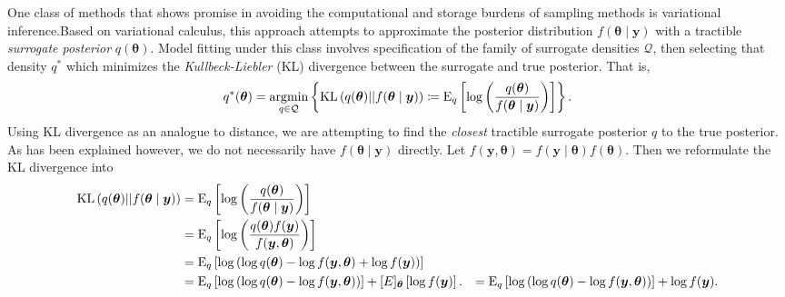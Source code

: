 One class of methods that shows promise in avoiding the computational and storage
    burdens of sampling methods is variational inference.\needcite  Based on variational
    calculus, this approach attempts to approximate the posterior distribution
    $f(\bm{\theta}\mid\bm{y})$ with a tractible \emph{surrogate posterior} 
    $q(\bm{\theta})$.  Model fitting under this class involves specification of the
    family of surrogate densities $\mathcal{Q}$, then selecting that density 
    $q^*$ which minimizes the \emph{Kullbeck-Liebler} (KL) divergence between 
    the surrogate and true posterior.  That is,
    \[
        q^*(\bm{\theta}) = \operatorname*{argmin}_{q\in\mathcal{Q}}\left\lbrace
        \text{KL}\left(q(\bm{\theta})||f(\bm{\theta}\mid\bm{y})\right) 
        \coloneqq
        \text{E}_{q}\left[\log\left(
        \frac{q(\bm{\theta})}{f(\bm{\theta}\mid\bm{y})}
        \right)\right]
        \right\rbrace.
    \]
    Using KL divergence as an analogue to distance, we are attempting to find
    the \emph{closest} tractible surrogate posterior $q$ to the true posterior.
    As has been explained however, we do not necessarily have $f(\bm{\theta}\mid\bm{y})$ 
    directly.  Let $f(\bm{y},\bm{\theta}) = f(\bm{y}\mid\bm{\theta})f(\bm{\theta})$.
    Then we reformulate the KL divergence into
    \[
        \begin{aligned}
        \text{KL}\left(q(\bm{\theta})||f(\bm{\theta}\mid\bm{y})\right) 
            &=\text{E}_{q}\left[\log\left(
                \frac{q(\bm{\theta})}{f(\bm{\theta}\mid\bm{y})}
                \right)\right]\\
            &= \text{E}_{q}\left[\log\left(
                \frac{q(\bm{\theta})f(\bm{y})}{f(\bm{y},\bm{\theta})}
                \right)\right]\\
            &= \text{E}_{q}\left[\log\left(
                \log q(\bm{\theta}) - \log f(\bm{y},\bm{\theta}) 
                + \log f(\bm{y})
                \right)\right]\\
            &= \text{E}_{q}\left[\log\left(
                \log q(\bm{\theta}) - \log f(\bm{y},\bm{\theta})\right)\right] + 
                    \text[E]_{\bm{\theta}}\left[\log f(\bm{y})\right].
            &= \text{E}_{q}\left[\log\left(
                \log q(\bm{\theta}) - \log f(\bm{y},\bm{\theta})\right)\right] + 
                   \log f(\bm{y}).
        \end{aligned}
    \]
